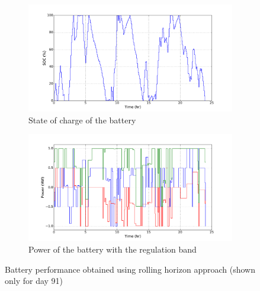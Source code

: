 \documentclass[11pt,twoside]{article}
\begin{document}
\begin{figure}[h!tp]
\centering
\begin{subfigure}[b]{0.49\textwidth} \includegraphics[width=\textwidth]{Figures/Plots/Horizon/SOC.pdf} \caption{State of charge of the battery}\label{sochor} \end{subfigure} \hfill
\begin{subfigure}[b]{0.49\textwidth} \includegraphics[width=\textwidth]{Figures/Plots/Horizon/P_band.pdf} \caption{Power of the battery with the regulation band}\label{pbandhor} \end{subfigure} \hfill
\caption{Battery performance obtained using rolling horizon approach (shown only for day 91)}\label{perfhor}
\end{figure}
\end{document}
